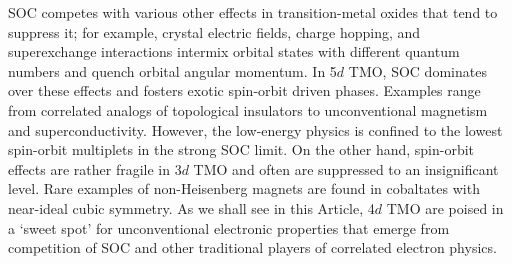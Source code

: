 \noindent
SOC competes with various other effects in transition-metal oxides that tend to suppress it; for example, crystal electric fields, charge hopping, and superexchange interactions intermix orbital states with different quantum numbers and quench orbital angular momentum. In 5$d$ TMO, SOC dominates over these effects and fosters exotic spin-orbit driven phases. Examples range from correlated analogs of topological insulators to unconventional magnetism  and superconductivity. However, the low-energy physics is confined to the lowest spin-orbit multiplets in the strong SOC limit. On the other hand, spin-orbit effects are rather fragile in 3$d$ TMO and often are suppressed to an insignificant level. Rare examples of non-Heisenberg magnets are found in cobaltates with near-ideal cubic symmetry. As we shall see in this Article, 4$d$ TMO are poised in a `sweet spot' for unconventional electronic properties that emerge from competition of SOC and other traditional players of correlated electron physics. 